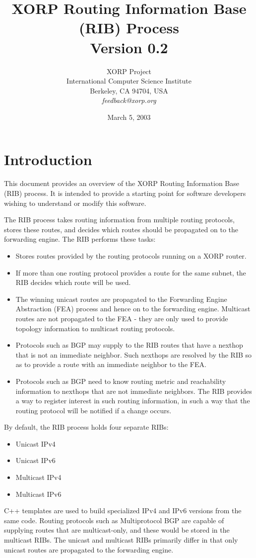 \documentclass[11pt]{article}
\title{XORP Routing Information Base (RIB) Process \\
\vspace{1ex}
Version 0.2}
\author{ XORP Project					\\
	 International Computer Science Institute	\\
	 Berkeley, CA 94704, USA			\\
	 {\it feedback@xorp.org}
}
\date{March 5, 2003}
\begin{document}
\maketitle                            
\section{Introduction}
This document provides an overview of the XORP Routing Information
Base (RIB) process.  It is intended to provide a starting point for
software developers wishing to understand or modify this software.

The RIB process takes routing information from multiple routing
protocols, stores these routes, and decides which routes should be
propagated on to the forwarding engine.  The RIB performs these tasks:
\begin{itemize}
\item Stores routes provided by the routing protocols running on a
XORP router.
\item If more than one routing protocol provides a route for the same
subnet, the RIB decides which route will be used.
\item The winning unicast routes are propagated to the Forwarding
Engine Abstraction (FEA) process and hence on to the forwarding
engine.  Multicast routes are not propagated to the FEA - they are
only used to provide topology information to multicast routing
protocols.
\item Protocols such as BGP may supply to the RIB routes that have a
nexthop that is not an immediate neighbor.  Such nexthops are resolved
by the RIB so as to provide a route with an immediate neighbor to the
FEA.
\item Protocols such as BGP need to know routing metric and
reachability information to nexthops that are not immediate
neighbors.  The RIB provides a way to register interest in such
routing information, in such a way that the routing protocol will be
notified if a change occurs.
\end{itemize}
By default, the RIB process holds four separate RIBs:
\begin{itemize}
\item Unicast IPv4
\item Unicast IPv6
\item Multicast IPv4
\item Multicast IPv6
\end{itemize}
C++ templates are used to build specialized IPv4 and IPv6 versions
from the same code.  Routing protocols such as Multiprotocol BGP are
capable of supplying routes that are multicast-only, and these would
be stored in the multicast RIBs.  The unicast and multicast RIBs
primarily differ in that only unicast routes are propagated to the
forwarding engine.
\end{document}
